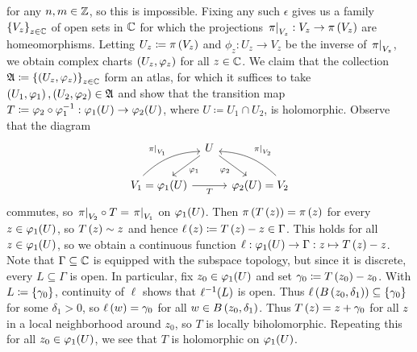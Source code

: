 \documentclass[../Moduli_Spaces_of_Riemann_Surfaces.tex]{subfiles}
\begin{document}
\begin{example}
\begin{equation*}
        \end{equation*}
        for any $n,m\in\mathbb{Z}$, so this is impossible. Fixing any such $\epsilon$ gives us a family $\left\{V_z\right\}_{z\in\mathbb{C}}$ of open sets in $\mathbb{C}$ for which the projections $\left.\pi\right|_{V_z}:V_z\to\pi\left(V_z\right)$ are homeomorphisms. Letting $U_z\coloneqq\pi\left(V_z\right)$ and $\phi_z:U_z\to V_z$ be the inverse of $\left.\pi\right|_{V_z}$, we obtain complex charts $\left(U_z,\varphi_z\right)$ for all $z\in\mathbb{C}$. We claim that the collection $\mathfrak{A}\coloneqq\left\{\left(U_z,\varphi_z\right)\right\}_{z\in\mathbb{C}}$ form an atlas, for which it suffices to take $\left(U_1,\varphi_1\right),\left(U_2,\varphi_2\right)\in\mathfrak{A}$ and show that the transition map $T\coloneqq\varphi_2\circ\varphi_1^{-1}:\varphi_1\!\left(U\right)\to\varphi_2\!\left(U\right)$, where $U\coloneqq U_1\cap U_2$, is holomorphic. Observe that the diagram
        \begin{equation*}
            \begin{tikzcd}[column sep=0.1in]
                & U \ar[dl, "\phi_1"] \ar[dr, "\phi_2"'] \\
                V_1=\phi_1(U) \ar[ur, "\l.\pi\r|_{V_1}", bend left=20, start anchor={[xshift=-20px]}] \ar[rr, "T"'] & & \phi_2(U)=V_2 \ar[ul, "\l.\pi\r|_{V_2}"', bend right=20, start anchor={[xshift=20px]}]
            \end{tikzcd}
        \end{equation*}
        commutes, so $\left.\pi\right|_{V_2}\circ T=\left.\pi\right|_{V_1}$ on $\varphi_1\!\left(U\right)$. Then $\pi\left(T\left(z\right)\right)=\pi\left(z\right)$ for every $z\in\varphi_1\!\left(U\right)$, so $T\left(z\right)\sim z$ and hence $\ell\left(z\right)\coloneqq T\left(z\right)-z\in\Gamma$. This holds for all $z\in\varphi_1\!\left(U\right)$, so we obtain a continuous function $\ell:\varphi_1\!\left(U\right)\to\Gamma:z\mapsto T\left(z\right)-z$. Note that $\Gamma\subseteq\mathbb{C}$ is equipped with the subspace topology, but since it is discrete, every $L\subseteq\Gamma$ is open. In particular, fix $z_0\in\varphi_1\!\left(U\right)$ and set $\gamma_0\coloneqq T\left(z_0\right)-z_0$. With $L\coloneqq\left\{\gamma_0\right\}$, continuity of $\ell$ shows that $\ell^{-1}\!\left(L\right)$ is open. Thus $\ell\left(B\left(z_0,\delta_1\right)\right)\subseteq\left\{\gamma_0\right\}$ for some $\delta_1>0$, so $\ell\left(w\right)=\gamma_0$ for all $w\in B\left(z_0,\delta_1\right)$. Thus $T\left(z\right)=z+\gamma_0$ for all $z$ in a local neighborhood around $z_0$, so $T$ is locally biholomorphic. Repeating this for all $z_0\in\varphi_1\!\left(U\right)$, we see that $T$ is holomorphic on $\varphi_1\!\left(U\right)$.\exqed
    \end{example}
\end{document}
